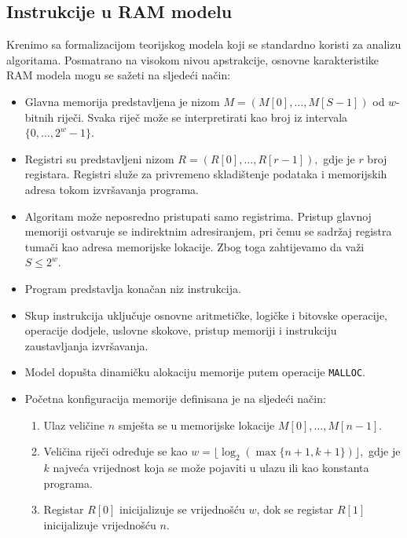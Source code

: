 \subsection{Instrukcije u RAM modelu}

Krenimo sa formalizacijom teorijskog modela koji se standardno koristi za analizu algoritama. Posmatrano na visokom nivou apstrakcije, osnovne karakteristike RAM modela mogu se sažeti na sljedeći način:

\begin{itemize}
	\item Glavna memorija predstavljena je nizom
	$
	M=(M[0],\ldots,M[S-1])
	$ 	od $w$-bitnih riječi. Svaka riječ može se interpretirati kao broj iz intervala 
		$\{0,\ldots,2^w-1\}.$ 

	\item Registri su predstavljeni nizom $
	R=(R[0],\ldots,R[r-1]), $ 	gdje je $r$ broj registara. Registri služe za privremeno skladištenje podataka i memorijskih adresa tokom izvršavanja programa.
	
	\item Algoritam može neposredno pristupati samo registrima. Pristup glavnoj memoriji ostvaruje se indirektnim adresiranjem, pri čemu se sadržaj registra tumači kao adresa memorijske lokacije. Zbog toga zahtijevamo da važi
	$
	S \leq 2^w.
	$
	
	\item Program predstavlja konačan niz instrukcija.
	
	\item Skup instrukcija uključuje osnovne aritmetičke, logičke i bitovske operacije, operacije dodjele, uslovne skokove, pristup memoriji i instrukciju zaustavljanja izvršavanja.
	
	\item Model dopušta dinamičku alokaciju memorije putem operacije \texttt{MALLOC}.
	
	\item Početna konfiguracija memorije definisana je na sljedeći način:
	\begin{enumerate}
		\item Ulaz veličine $n$ smješta se u memorijske lokacije
		$
		M[0],\ldots,M[n-1].
		$
		
		\item Veličina riječi određuje se kao
		$
		w=\lfloor \log_2(\max\{n+1,k+1\}) \rfloor,
		$
		gdje je $k$ najveća vrijednost koja se može pojaviti u ulazu ili kao konstanta programa.
		
		\item Registar $R[0]$ inicijalizuje se vrijednošću $w$, dok se registar $R[1]$ inicijalizuje vrijednošću $n$.
	\end{enumerate}
	
	
\end{itemize}

